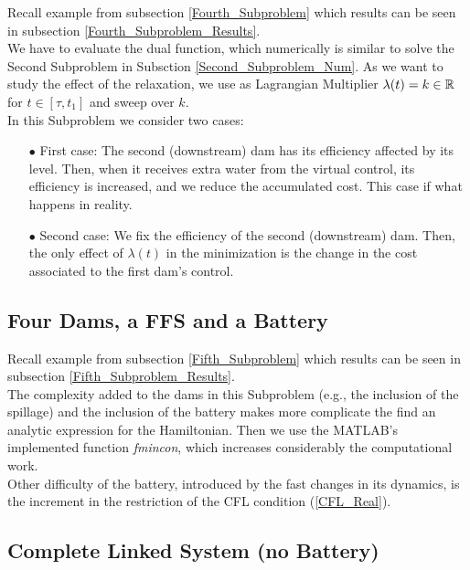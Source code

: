 Recall example from subsection \ref{Fourth_Subproblem} which results can be seen in subsection \ref{Fourth_Subproblem_Results}.\\

We have to evaluate the dual function, which numerically is similar to solve the Second Subproblem in Subsction \ref{Second_Subproblem_Num}. As we want to study the effect of the relaxation, we use as Lagrangian Multiplier $\lambda(t)=k\in\mathbb{R}$ for $t\in[\tau,t_1]$ and sweep over $k$.\\
In this Subproblem we consider two cases:

\begin{enumerate}

\item[$\bullet$] First case: The second (downstream) dam has its efficiency affected by its level. Then, when it receives extra water from the virtual control, its efficiency is increased, and we reduce the accumulated cost. This case if what happens in reality.

\item[$\bullet$] Second case: We fix the efficiency of the second (downstream) dam. Then, the only effect of $\lambda(t)$ in the minimization is the change in the cost associated to the first dam's control.

\end{enumerate}


\subsection{Four Dams, a FFS and a Battery} \label{Fifth_Subproblem_Num}

Recall example from subsection \ref{Fifth_Subproblem}  which results can be seen in subsection \ref{Fifth_Subproblem_Results}.\\

The complexity added to the dams in this Subproblem (e.g., the inclusion of the spillage) and the inclusion of the battery makes more complicate the find an analytic expression for the Hamiltonian. Then we use the MATLAB's implemented function \textit{fmincon}, which increases considerably the computational work.\\
Other difficulty of the battery, introduced by the fast changes in its dynamics, is the increment in the restriction of the CFL condition (\ref{CFL_Real}).

\subsection{Complete Linked System (no Battery)} \label{Sixth_Subproblem_Num}

